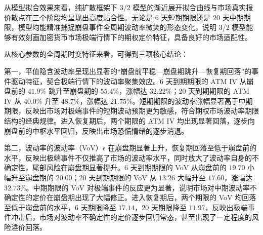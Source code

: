 \begin{table}[htbp]
  \centering
  \caption{崩盘事件全周期 3/2 模型时变参数校准结果}
  \label{tab:calibration_results}
\end{table}
从模型拟合效果来看，纯扩散框架下 3/2 模型的渐近展开拟合曲线与市场真实报价散点在三个阶段均呈现出高度贴合性。无论是 6 天短期期限还是 20 天中期期限，模型均能精准捕捉崩盘事件全周期波动率微笑的形态变化，说明 3/2 模型能够有效刻画加密货币市场极端行情下的期权定价特征，具备良好的市场适配性。

从核心参数的全周期时变特征来看，可得到三项核心结论：

第一，平值隐含波动率呈现出显著的“崩盘前平稳—崩盘期跳升—恢复期回落”的事件驱动特征，契合极端行情下的波动率聚集效应。6 天到期期限的 ATM IV 从崩盘前的 $41.9\%$ 跳升至崩盘期的 $55.4\%$，涨幅达 $32.22\%$；20 天到期期限的 ATM IV 从 $40.0\%$ 升至 $48.7\%$，涨幅达 $21.75\%$。短期期限的波动率涨幅显著高于中期期限，反映出市场对极端事件的短期波动预期更为敏感，符合期权市场波动率期限结构的经典规律。进入恢复期后，两个期限的 ATM IV 均出现显著回落，逐步向崩盘前的中枢水平回归，反映出市场恐慌情绪的逐步消退。

第二，波动率的波动率（VoV）$\epsilon$ 在崩盘期显著上升，恢复期回落至低于崩盘前的水平，反映出极端事件不仅推高了市场的波动率水平，同时放大了波动率自身的不确定性，尾部风险在崩盘期显著提升。6 天到期期限的 VoV 从崩盘前的 $19.70$ 小幅升至崩盘期的 $20.00$；20 天到期期限的 VoV 从 $13.26$ 大幅升至 $17.60$，涨幅达 $32.73\%$。中期期限的 VoV 对极端事件的反应更为显著，说明市场对中期波动率不确定性的定价在崩盘期出现了大幅修正。进入恢复期后，两个期限的 VoV 均回落至低于崩盘前的水平，6 天期限降至 $17.14$，20 天期限降至 $11.97$，反映出极端事件冲击后，市场对波动率不确定性的定价逐步回归常态，甚至出现了一定程度的风险溢价回落。

